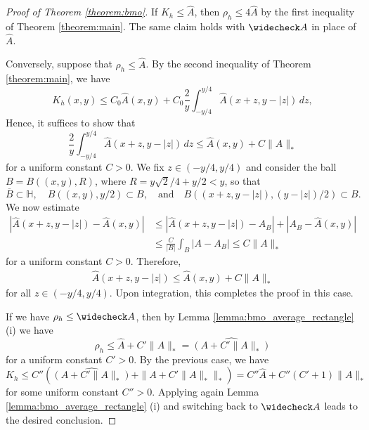 \documentclass{amsart}
\theoremstyle{plain}
\theoremstyle{definition}
\theoremstyle{remark}
\numberwithin{equation}{section}
\numberwithin{theorem}{section}
\numberwithin{conjecture}{section}
\newcommand{\br}{\overline}
\newcommand{\1}{\mathbf 1}
\newcommand{\UHP}{\mathbb H}
\begin{document}
\begin{proof}[Proof of Theorem \ref{theorem:bmo}]
If $K_h\leq \widehat{A}$, then $\rho_h\leq 4\widehat A$ by the first inequality of Theorem \ref{theorem:main}. The same claim holds with $\widecheck A$ in place of $\widehat A$.

Conversely, suppose that $\rho_h\leq \widehat{A}$. By the second inequality of Theorem \ref{theorem:main}, we have
$$K_h(x,y)\leq C_0\widehat{A}(x,y)+ C_0 \frac{2}{y}\int_{-y/4}^{y/4} \widehat{A}(x+z,y-|z|)\, dz, $$
Hence, it suffices to show that 
$$\frac{2}{y}\int_{-y/4}^{y/4} \widehat{A}(x+z,y-|z|)\, dz \leq \widehat{A}(x,y)+C\|A\|_*$$
for a uniform constant $C>0$. We fix $z\in (-y/4,y/4)$ and consider the ball $B=B((x,y),R)$, where $R=y\sqrt{2}/4+ y/2<y$, so that 
$$\br B\subset \UHP,\quad B((x,y),y/2) \subset B, \quad\textrm{and}\quad B( (x+z,y-|z|),(y-|z|)/2)\subset B.$$ We now estimate
\begin{align*}
|\widehat{A}(x+z,y-|z|)-\widehat{A}(x,y)| &\leq |\widehat{A}(x+z,y-|z|)-A_B|+|A_B-\widehat{A}(x,y)|\\
&\leq \frac{C}{|B|} \int_B |A-A_B|\leq C\|A\|_*
\end{align*}
for a uniform constant $C>0$. Therefore,
\begin{align*}
\widehat{A}(x+z,y-|z|) \leq \widehat{A}(x,y) + C\|A\|_*
\end{align*}
for all $z\in (-y/4,y/4)$. Upon integration, this completes the proof in this case.

If we have $\rho_h\leq \widecheck A$, then by Lemma \ref{lemma:bmo_average_rectangle} (i) we have 
$$\rho_h\leq \widehat{A}+C'\|A\|_* = \widehat{(A+C'\|A\|_*)}$$
for a uniform constant $C'>0$. By the previous case, we have
$$K_h \leq C'' ( \widehat{(A+C'\|A\|_*)}  +  \|A+C'\|A\|_* \|_* ) = C'' \widehat A + C''(C'+1)\|A\|_*$$
for some uniform constant $C''>0$. Applying again Lemma \ref{lemma:bmo_average_rectangle} (i) and switching back to $\widecheck A$ leads to the desired conclusion.
\end{proof}

\bigskip


\end{document}
